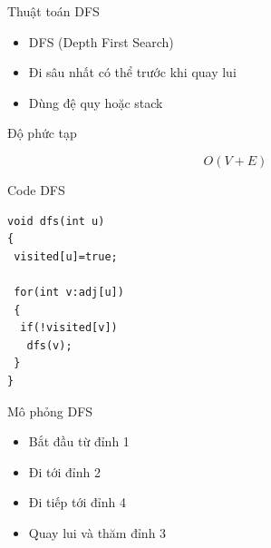 \documentclass[aspectratio=169]{beamer}
\begin{document}
\begin{frame}{Thuật toán DFS}

\begin{itemize}

\item DFS (Depth First Search)

\item Đi sâu nhất có thể trước khi quay lui

\item Dùng đệ quy hoặc stack

\end{itemize}

\begin{block}{Độ phức tạp}

\[
O(V+E)
\]

\end{block}

\end{frame}

\begin{frame}[fragile]{Code DFS}

\begin{verbatim}
void dfs(int u)
{
 visited[u]=true;

 for(int v:adj[u])
 {
  if(!visited[v])
   dfs(v);
 }
}
\end{verbatim}

\end{frame}

\begin{frame}{Mô phỏng DFS}

\begin{center}


\end{center}

\begin{itemize}

\item<1-> Bắt đầu từ đỉnh 1
\item<2-> Đi tới đỉnh 2
\item<3-> Đi tiếp tới đỉnh 4
\item<4-> Quay lui và thăm đỉnh 3

\end{itemize}

\end{frame}
\end{document}
